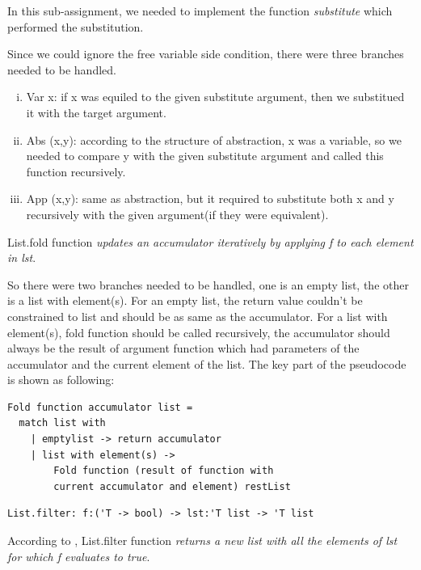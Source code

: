 \documentclass{article}
\begin{document}
In this sub-assignment, we needed to implement the function \emph{substitute} which performed the substitution.

Since we could ignore the free variable side condition, there were three branches needed to be handled.


\begin{enumerate}[(i)]
\item Var x: if x was equiled to the given substitute argument, then we substitued it with the target argument.
\item Abs (x,y): according to the structure of abstraction, x was a variable, so we needed to compare y with the given substitute argument and called this function recursively.
\item App (x,y): same as abstraction, but it required to substitute both x and y recursively with the given argument(if they were equivalent).
\end{enumerate}

List.fold function \emph{updates an accumulator iteratively by applying f to each element in lst}. 

So there were two branches needed to be handled, one is an empty list, the other is a list with element(s). For an empty list, the return value couldn't be constrained to list and should be as same as the accumulator. For a list with element(s), fold function should be called recursively, the accumulator should always be the result of argument function which had parameters of the accumulator and the current element of the list. The key part of the pseudocode is shown as following:

\begin{lstlisting}
Fold function accumulator list =
  match list with
    | emptylist -> return accumulator
    | list with element(s) -> 
        Fold function (result of function with 
        current accumulator and element) restList
\end{lstlisting}


\begin{lstlisting}
List.filter: f:('T -> bool) -> lst:'T list -> 'T list
\end{lstlisting}

According to \cite{sporring2019}, List.filter function \emph{returns a new list with all the elements of lst for which f evaluates to true}. 
\end{document}
